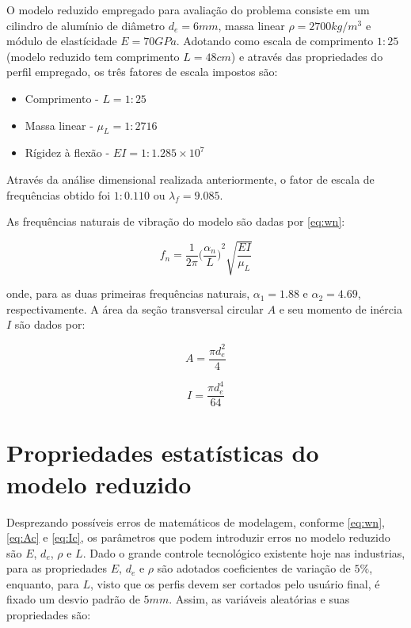 O modelo reduzido empregado para avaliação do problema consiste em um
cilindro de alumínio de diâmetro \(d_e=6mm\), massa linear
\(\rho=2700kg/m^3\) e módulo de elastícidade \(E=70GPa\). Adotando como
escala de comprimento \(1:25\) (modelo reduzido tem comprimento
\(L=48cm\)) e através das propriedades do perfil empregado, os três
fatores de escala impostos são:

\begin{itemize}
\item
  Comprimento - \(L = 1:25\)
\item
  Massa linear - \(\mu_L = 1:2716\)
\item
  Rígidez à flexão - \(EI = 1:1.285\times10^7\)
\end{itemize}

Através da análise dimensional realizada anteriormente, o fator de
escala de frequências obtido foi \(1:0.110\) ou \(\lambda_f = 9.085\).

    As frequências naturais de vibração do modelo são dadas por \ref{eq:wn}:

\begin{equation}
f_n = \frac{1}{2\pi} {\Big( \frac{\alpha_n}{L} \Big)}^2 \sqrt{\frac{EI}{\mu_L}}
\label{eq:wn}
\end{equation}

onde, para as duas primeiras frequências naturais, \(\alpha_1=1.88\) e
\(\alpha_2=4.69\), respectivamente. A área da seção transversal circular
\(A\) e seu momento de inércia \(I\) são dados por:

\begin{equation}
A = \frac{\pi d_e^2}{4}
\label{eq:Ac}
\end{equation}

\begin{equation}
I = \frac{\pi d_e^4}{64}
\label{eq:Ic}
\end{equation}

    \hypertarget{propriedades-estatuxedsticas-do-modelo-reduzido}{%
\section{Propriedades estatísticas do modelo
reduzido}\label{propriedades-estatuxedsticas-do-modelo-reduzido}}

Desprezando possíveis erros de matemáticos de modelagem, conforme
\ref{eq:wn}, \ref{eq:Ac} e \ref{eq:Ic}, os parâmetros que podem
introduzir erros no modelo reduzido são \(E\), \(d_e\), \(\rho\) e
\(L\). Dado o grande controle tecnológico existente hoje nas industrias,
para as propriedades \(E\), \(d_e\) e \(\rho\) são adotados coeficientes
de variação de \(5\%\), enquanto, para \(L\), visto que os perfis devem
ser cortados pelo usuário final, é fixado um desvio padrão de \(5mm\).
Assim, as variáveis aleatórias e suas propriedades são:

